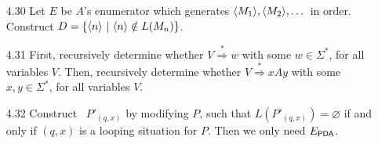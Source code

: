 \begin{itemize}
	\item[4.30]
	Let $E$ be $A$'s enumerator which generates $\Bra{M_1}, \Bra{M_2}, \dots$ in order. Construct $D = \{ \Bra{n} \ | \ \Bra{n} \notin L(M_n) \}$.
	
	\item[4.31]
	First, recursively determine whether $V \overset{*}{\Rightarrow} w$ with some $w \in \Sigma^*$, for all variables $V$. Then, recursively determine whether $V \overset{*}{\Rightarrow} xAy$ with some $x, y \in \Sigma^*$, for all variables $V$.
	
	\item[4.32]
	Construct \DPDA\ $P'_{(q,x)}$ by modifying $P$, such that $L(P'_{(q,x)}) = \varnothing$ if and only if $(q, x)$ is a looping situation for $P$. Then we only need $E_{\PDA}$.
	
\end{itemize}